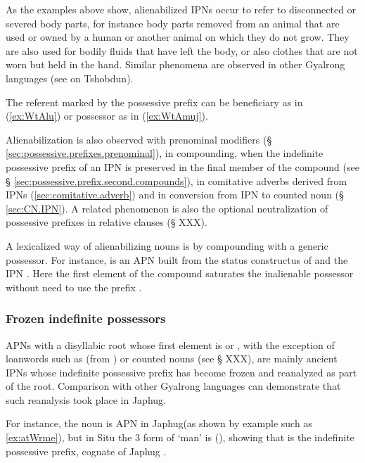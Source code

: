 As the examples above show, alienabilized IPNs occur to refer to disconnected or severed body parts, for instance body parts removed from an animal that are used or owned by a human or another animal on which they do not grow. They are also used for bodily fluids that have left the body, or also clothes that are not worn but held in the hand. Similar phenomena are observed in other Gyalrong languages (see \citealt[140]{jackson98morphology} on Tshobdun).

The referent marked by the possessive prefix can be beneficiary as in (\ref{ex:WtAlu}) or possessor as in (\ref{ex:WtAmuj}).
 
Alienabilization is also observed with prenominal modifiers (§ \ref{sec:possessive.prefixes.prenominal}), in compounding, when the indefinite possessive prefix of an IPN is preserved in the final member of the compound (see § \ref{sec:possessive.prefix.second.compounds}), in comitative adverbs derived from IPNs (\ref{sec:comitative.adverb}) and in conversion from IPN to counted noun (§ \ref{sec:CN.IPN}). A related phenomenon is also the optional neutralization of possessive prefixes in relative clauses (§ XXX).
 
A lexicalized way of alienabilizing nouns is by compounding with a generic possessor. For instance,  is an APN built from the status constructus of  and the IPN . Here the first element of the compound  saturates the inalienable possessor without need to use the prefix .

\subsubsection{Frozen indefinite possessors} \label{sec:frozen.indef}
APNs with a disyllabic root whose first element is  or , with the exception of loanwords such as  (from ) or counted nouns (see § XXX), are mainly ancient IPNs whose indefinite possessive prefix  has become frozen and reanalyzed as part of the root. Comparison with other Gyalrong languages can demonstrate that such reanalysis took place in Japhug.

For instance, the noun  is APN in Japhug(as shown by example such as \ref{ex:atWrme}), but in Situ the 3\sg{} form of  `man' is   (\citealt[183;197]{lin09phd}), showing that  is the indefinite possessive prefix, cognate of Japhug . 

